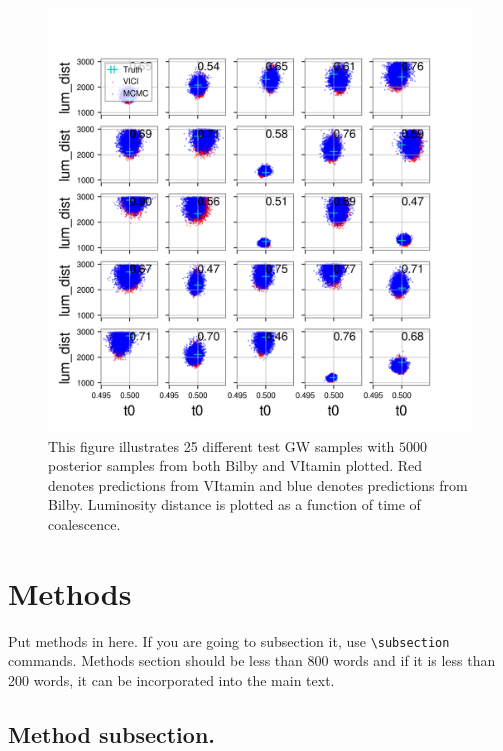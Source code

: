 \documentclass[%
showpacs,
 amsmath,amssymb,
 aps,
 twocolumn,
 prl,
 reprint,
floatfix,
]{revtex4-1}
\begin{document}
%
%
\begin{figure}
    \includegraphics[width=\columnwidth]{images/posteriors_13.png}
    \caption{\label{fig:lum_dist-t0_scatter} This figure illustrates 
    25 different test GW samples with $5000$ posterior samples 
    from both Bilby and VItamin plotted. Red denotes predictions 
    from VItamin and blue denotes predictions from Bilby. Luminosity 
    distance is plotted as a function of time of coalescence.}
\end{figure}

%
%

\section{Methods}
Put methods in here.  If you are going to subsection it, use
\verb|\subsection| commands.  Methods section should be less than
800 words and if it is less than 200 words, it can be incorporated
into the main text.

\subsection{Method subsection.}
\end{document}

